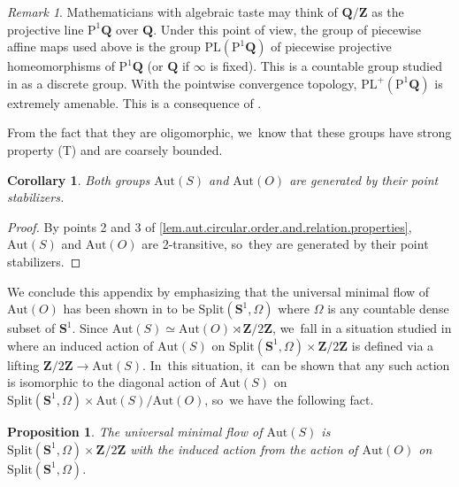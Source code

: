 \documentclass[JEP,XML,SOM,Unicode,NoFloatCountersInSection,published]{cedram}
\theoremstyle{plain}
\newtheorem{corollary}[theorem]{Corollary}
\newtheorem{proposition}[theorem]{Proposition}
\theoremstyle{definition}
\theoremstyle{remark}
\newtheorem{remark}[theorem]{Remark}
\newcommand{\Aut}{\mathrm{Aut}}
\newcommand{\Split}{\mathrm{Split}}
\begin{document}
\begin{remark}
Mathematicians with algebraic taste may think of $\mathbf{Q}/\mathbf{Z}$ as the projective line $\mathrm{P}^1\mathbf{Q}$ over $\mathbf{Q}$.
Under this point of view, the group of piecewise affine maps used above is the group $\mathrm{PL}(\mathrm{P}^1\mathbf{Q})$ of piecewise projective homeomorphisms of $\mathrm{P}^1\mathbf{Q}$ (or $\mathbf{Q}$ if $\infty$ is fixed).
This is a countable group studied in \cite{Monod-2013} as a discrete group.
With the pointwise convergence topology, $\mathrm{PL}^+(\mathrm{P}^1\mathbf{Q})$ is extremely amenable. This is a consequence of \cite[Main\,th.]{MR1608494}.
\end{remark}

From the fact that they are oligomorphic, we~know that these groups have strong property (T) and are coarsely bounded.

\begin{corollary}
\label{cor.aut.circular.order.generated.by.stabilizers}
Both groups $\Aut(S)$ and $\Aut(O)$ are generated by their point stabilizers.
\end{corollary}

\begin{proof}
By points 2 and 3 of \cref{lem.aut.circular.order.and.relation.properties}, $\Aut(S)$ and $\Aut(O)$ are 2-transitive, so~they are generated by their point stabilizers.
\end{proof}

We conclude this appendix by emphasizing that the universal minimal flow of $\Aut(O)$ has been shown in \cite{Glasner-Megrelishvili-2021} to be $\Split(\mathbf{S}^1,\Omega)$ where $\Omega$ is any countable dense subset of $\mathbf{S}^1$.
Since $\Aut(S)\simeq\Aut(O)\rtimes\mathbf{Z}/2\mathbf{Z}$, we~fall in a situation studied in \cite[App.\,3]{AlexanderS2012} where an induced action of $\Aut(S)$ on $\Split(\mathbf{S}^1,\Omega)\times \mathbf{Z}/2\mathbf{Z}$ is defined via a lifting $\mathbf{Z}/2\mathbf{Z}\to\Aut(S)$. In~this situation, it~can be shown that any such action is isomorphic to the diagonal action of $\Aut(S)$ on $\Split(\mathbf{S}^1,\Omega)\times\Aut(S)/\Aut(O)$, so~we have the following fact.

\begin{proposition}
\label{prop.univ.min.flow.aut(s)}
The universal minimal flow of $\Aut(S)$ is $\Split(\mathbf{S}^1,\Omega)\times \mathbf{Z}/2\mathbf{Z}$ with the induced action from the action of $\Aut(O)$ on $\Split(\mathbf{S}^1,\Omega)$.
\end{proposition}
\end{document}
